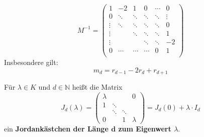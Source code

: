 \documentclass[parskip,a4paper,twoside,DIV15,BCOR12mm]{scrbook}
\begin{document}
\begin{note}
\[
M^{-1}=\begin{pmatrix}
    1&-2&1&0&\cdots&0\\
    0&\ddots&\ddots&\ddots&\ddots&\vdots\\
    \vdots&\ddots&\ddots&\ddots&\ddots&0\\
    \vdots&&\ddots&\ddots&\ddots&1\\
    \vdots&&&\ddots&\ddots&-2\\
    0&\cdots&\cdots&\cdots&0&1\\
\end{pmatrix}
\]
Insbesondere gilt:
\begin{equation}
\label{eq: Formel Anzahl Jordankaestchen}
m_{d}=r_{d-1}-2r_{d}+r_{d+1}
\end{equation}
\end{note}
\begin{definition}
Für \(\lambda\in K\) und \(d\in\mathbb{N}\) heißt die Matrix
\[
J_{d}(\lambda)=\begin{pmatrix}
    \lambda&&&0\\
    1&\ddots&&\\
    &\ddots&\ddots&\\
    0&&1&\lambda
\end{pmatrix}=J_{d}(0)+\lambda\cdot I_{d}
\]
ein \textbf{Jordankästchen der Länge \(\mathbf{d}\) zum Eigenwert \(\lambda\)}.
\end{definition}
\end{document}
